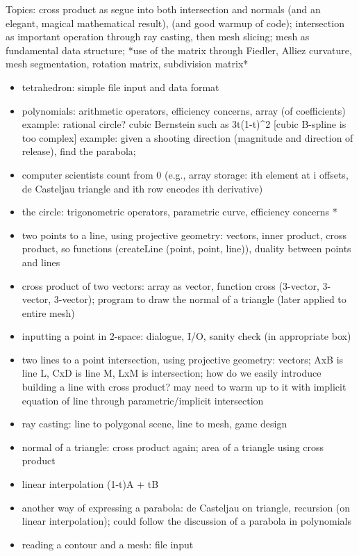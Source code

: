 \documentclass[11pt]{article}
\begin{document}
Topics:
cross product as segue into both intersection and normals (and an elegant, magical mathematical result),
(and good warmup of code);
intersection as important operation through ray casting, then mesh slicing;
mesh as fundamental data structure;
*use of the matrix through Fiedler, Alliez curvature, mesh segmentation, rotation matrix, subdivision matrix*
\begin{itemize}
\item tetrahedron: simple file input and data format
\item polynomials: arithmetic operators, efficiency concerns, array (of coefficients)
      example: rational circle? cubic Bernstein such as 3t(1-t)^2 [cubic B-spline is too complex]
      example: given a shooting direction (magnitude and direction of release), find the parabola;
\item computer scientists count from 0 (e.g., array storage: ith element at i offsets, de Casteljau triangle and ith row encodes ith derivative)
\item the circle: trigonometric operators, parametric curve, efficiency concerns
*\item two points to a line, using projective geometry: vectors, inner product, 
      cross product, so functions (createLine (point, point, line)), duality between points and lines
\item cross product of two vectors: array as vector, function cross (3-vector, 3-vector, 3-vector);
      program to draw the normal of a triangle (later applied to entire mesh)
\item inputting a point in 2-space: dialogue, I/O, sanity check (in appropriate box)
\item two lines to a point intersection, using projective geometry: vectors;
      AxB is line L, CxD is line M, LxM is intersection;
      how do we easily introduce building a line with cross product?
      may need to warm up to it with implicit equation of line through parametric/implicit intersection
\item ray casting: line to polygonal scene, line to mesh, game design
\item normal of a triangle: cross product again;
      area of a triangle using cross product
\item linear interpolation (1-t)A + tB
\item another way of expressing a parabola: de Casteljau on triangle, 
      recursion (on linear interpolation); could follow the discussion of a parabola in polynomials
\item reading a contour and a mesh: file input

\end{itemize}
\end{document}
